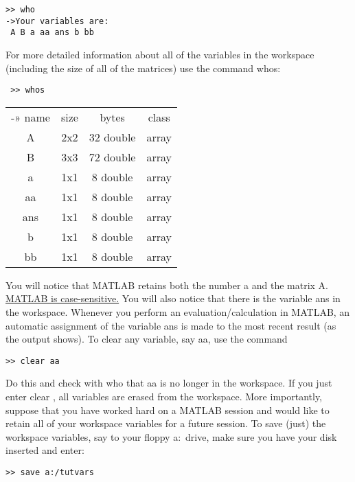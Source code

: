 \documentclass[../main.tex]{subfiles}
\begin{document}
\begin{verbatim}
>> who 
->Your variables are:
 A B a aa ans b bb 
\end{verbatim}

\noindent For more detailed information about all of the variables in the workspace
(including the size of all of the matrices) use the command whos: 

\begin{verbatim}
 >> whos
\end{verbatim}
\noindent \begin{tabular}{cccc}
-»		name&size&bytes&class\\
		A&2x2&32 double&array\\

		B&3x3&72 double&array\\

		a&1x1&8 double&array\\

		aa&1x1&8 double&array\\

		ans&1x1&8 double&array\\

		b&1x1&8 double&array\\

		bb&1x1&8 double&array\\	
\end{tabular}

\vspace{0.25cm}

You will notice that MATLAB retains both the number a and the matrix A.
\underline{MATLAB is case-sensitive.} You will also notice that there is the variable ans in
the workspace. Whenever you perform an evaluation/calculation in MATLAB, an
automatic assignment of the variable ans is made to the most recent result (as the
output shows). To clear any variable, say aa, use the command

\begin{verbatim}
>> clear aa
\end{verbatim}

Do this and check with who that aa is no longer in the workspace. If you just
enter clear , all variables are erased from the workspace. More importantly,
suppose that you have worked hard on a MATLAB session and would like to
retain all of your workspace variables for a future session. To save (just) the
workspace variables, say to your floppy a:\ drive, make sure you have your disk
inserted and enter: 

\begin{verbatim}
>> save a:/tutvars 
\end{verbatim}
\end{document}
